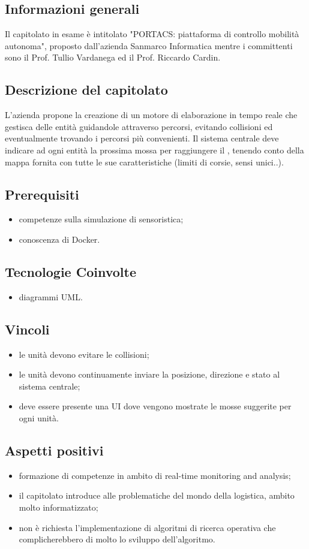 \subsection{Informazioni generali}
Il capitolato in esame è intitolato "PORTACS: piattaforma di controllo mobilità autonoma", proposto dall'azienda Sanmarco Informatica mentre i committenti sono il Prof. Tullio Vardanega ed il Prof. Riccardo Cardin.
\subsection{Descrizione del capitolato}
L'azienda propone la creazione di un motore di elaborazione in tempo reale che gestisca delle entità guidandole attraverso percorsi, evitando collisioni ed eventualmente trovando i percorsi più convenienti.
Il sistema centrale deve indicare ad ogni entità la prossima mossa per raggiungere il , tenendo conto della mappa fornita con tutte le sue caratteristiche (limiti di corsie, sensi unici..).
\subsection{Prerequisiti}
\begin{itemize}
    \item competenze sulla simulazione di sensoristica;
    \item conoscenza di Docker.
\end{itemize}
\subsection{Tecnologie Coinvolte}
\begin{itemize}
    \item diagrammi UML.
\end{itemize}
\subsection{Vincoli}
\begin{itemize}
    \item le unità devono evitare le collisioni;
    \item le unità devono continuamente inviare la posizione, direzione e stato al sistema centrale;
    \item deve essere presente una UI dove vengono mostrate le mosse suggerite per ogni unità.
\end{itemize}
\subsection{Aspetti positivi}
\begin{itemize}
    \item formazione di competenze in ambito di real-time monitoring and analysis;
    \item il capitolato introduce alle problematiche del mondo della logistica, ambito molto informatizzato;
    \item non è richiesta l'implementazione di algoritmi di ricerca operativa che complicherebbero di molto lo sviluppo dell'algoritmo.
\end{itemize}
